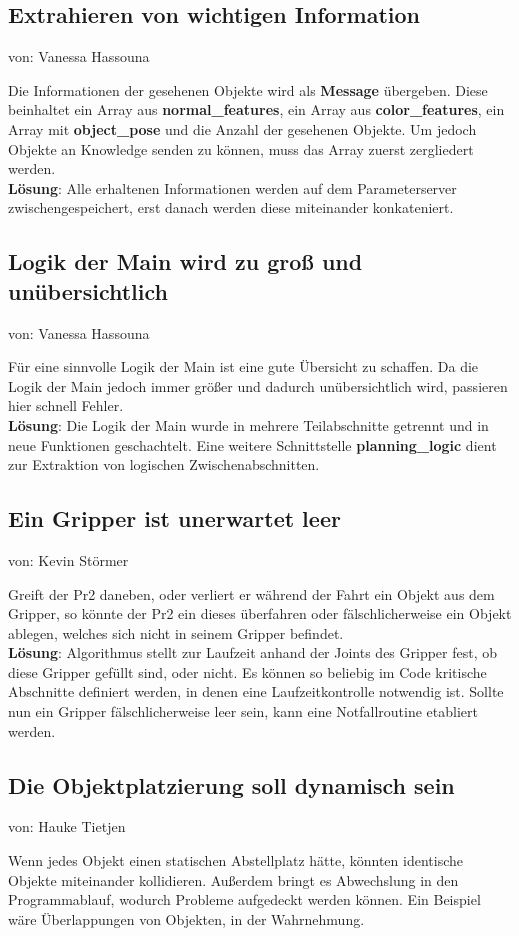 \documentclass{suturo}
\makeatletter
\newcommand{\chapterauthor}[1]{%
  {\parindent0pt\vspace*{-27pt}%
  \linespread{0}\small\begin{flushright}von: #1\end{flushright}%
  \par\nobreak\vspace*{0pt}}
  \@afterheading%
}
\makeatother
\begin{document}
\subsection{Extrahieren von wichtigen Information}
\chapterauthor{Vanessa Hassouna}

Die Informationen der gesehenen Objekte wird als \textbf{Message} übergeben. Diese beinhaltet ein Array aus \textbf{normal\_features}, ein Array aus \textbf{color\_features}, ein Array mit \textbf{object\_pose} und die Anzahl der gesehenen Objekte. 
Um jedoch Objekte an Knowledge senden zu können, muss das Array zuerst zergliedert werden. \\

\textbf{Lösung}: Alle erhaltenen Informationen werden auf dem Parameterserver zwischengespeichert, erst danach werden diese miteinander konkateniert.

\subsection{Logik der Main wird zu groß und unübersichtlich}
\chapterauthor{Vanessa Hassouna}
Für eine sinnvolle Logik der Main ist eine gute Übersicht zu schaffen. Da die Logik der Main jedoch immer größer und dadurch unübersichtlich wird, passieren hier schnell Fehler.\\

\textbf{Lösung}: Die Logik der Main wurde in mehrere Teilabschnitte getrennt und in neue Funktionen geschachtelt. Eine weitere Schnittstelle \textbf{planning\_logic} dient zur Extraktion von logischen Zwischenabschnitten.


\subsection{Ein Gripper ist unerwartet leer}
\chapterauthor{Kevin Störmer}
Greift der Pr2 daneben, oder verliert er während der Fahrt ein Objekt aus dem Gripper, so könnte der Pr2 ein dieses überfahren oder fälschlicherweise ein Objekt ablegen, welches sich nicht in seinem Gripper befindet.\\

\textbf{Lösung}: Algorithmus stellt zur Laufzeit anhand der Joints des Gripper fest, ob diese Gripper gefüllt sind, oder nicht. Es können so beliebig im Code kritische Abschnitte definiert werden, in denen eine Laufzeitkontrolle notwendig ist. Sollte nun ein Gripper fälschlicherweise leer sein, kann eine Notfallroutine etabliert werden.

\subsection{Die Objektplatzierung soll dynamisch sein}
\chapterauthor{Hauke Tietjen}
Wenn jedes Objekt einen statischen Abstellplatz hätte, könnten identische Objekte miteinander kollidieren. Außerdem bringt es Abwechslung in den Programmablauf, wodurch Probleme aufgedeckt werden können. Ein Beispiel wäre Überlappungen von Objekten, in der Wahrnehmung. \\
\end{document}
